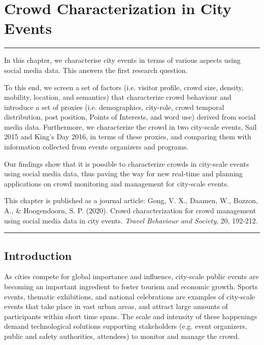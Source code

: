 \chapter{Crowd Characterization in City Events}\label{ch2_title}

\noindent\rule{\textwidth}{1pt}

In this chapter, we characterise city events in terms of various aspects using social media data. This answers the first research question. 

To this end, we screen a set of factors (i.e. visitor profile, crowd size, density, mobility, location, and semantics) that characterize crowd behaviour and introduce a set of proxies (i.e. demographics, city-role, crowd temporal distribution, post position, Points of Interests, and word use) derived from social media data. Furthermore, we characterize the crowd in two city-scale events, Sail 2015 and King's Day 2016, in terms of these proxies, and comparing them with information collected from events organizers and programs.

Our findings show that it is possible to characterize crowds in city-scale events using social media data, thus paving the way for new real-time and planning applications on crowd monitoring and management for city-scale events.

This chapter is published as a journal article: Gong, V. X., Daamen, W., Bozzon, A., \& Hoogendoorn, S. P. (2020). Crowd characterization for crowd management using social media data in city events. \emph{Travel Behaviour and Society}, 20, 192-212.

\noindent\rule{\textwidth}{1pt}

\newpage


\vspace*{-10mm}
\section{Introduction}\label{ch2_2.1_introduction}

As cities compete for global importance and influence, city-scale public events are becoming an important ingredient to foster tourism and economic growth. Sports events, thematic exhibitions, and national celebrations are examples of city-scale events that take place in vast urban areas, and attract large amounts of participants within short time spans. The scale and intensity of these happenings demand technological solutions supporting stakeholders (e.g. event organizers, public and safety authorities, attendees) to monitor and manage the crowd.
